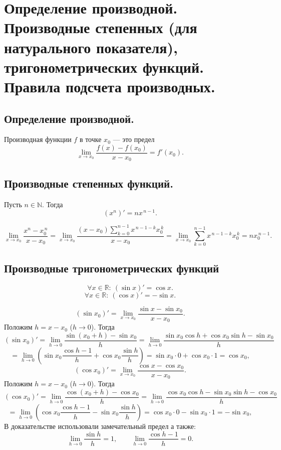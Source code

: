 \section{Определение производной. Производные степенных (для натурального показателя), тригонометрических функций. Правила подсчета производных.}

\subsection{Определение производной.}

\begin{definition}
Производная функции $f$ в точке $x_0$ — это предел
\[
\lim_{x\to x_0}\frac{f(x)-f(x_0)}{x-x_0}
=f'(x_0).
\]
\end{definition}



\subsection{Производные степенных функций.}
\begin{theorem}
Пусть $n\in\mathbb{N}$. Тогда
\[
(x^n)' = n x^{\,n-1}.
\]

\end{theorem}

\begin{Proof}
\[
\lim_{x\to x_0}\frac{x^n-x_0^{\,n}}{x-x_0}
=\lim_{x\to x_0}\frac{(x-x_0)\displaystyle\sum_{k=0}^{n-1}x^{\,n-1-k}x_0^{\,k}}{x-x_0}
=\lim_{x\to x_0}\displaystyle\sum_{k=0}^{n-1}x^{\,n-1-k}x_0^{\,k}
= n x_0^{\,n-1}.
\]
\end{Proof}



\subsection{Производные тригонометрических функций}
\begin{theorem}
\[
\forall x\in\mathbb{R}:\ (\sin x)'=\cos x.
\]
\[
\forall x\in\mathbb{R}:\ (\cos x)'=-\sin x.
\]
\end{theorem}
\begin{Proof}
\[
(\sin x_0)'=\lim_{x\to x_0}\frac{\sin x-\sin x_0}{x-x_0}.
\]
Положим $h=x-x_0$ ($h\to 0$). Тогда
\[
(\sin x_0)'=\lim_{h\to 0}\frac{\sin(x_0+h)-\sin x_0}{h}
=\lim_{h\to 0}\frac{\sin x_0\cos h+\cos x_0\sin h-\sin x_0}{h}
\]
\[
=\lim_{h\to 0}\left(\sin x_0\frac{\cos h-1}{h}+\cos x_0\frac{\sin h}{h}\right)
=\sin x_0\cdot 0+\cos x_0\cdot 1=\cos x_0,
\]
\[
\]
\[
(\cos x_0)'=\lim_{x\to x_0}\frac{\cos x-\cos x_0}{x-x_0}.
\]
Положим $h=x-x_0$ ($h\to 0$). Тогда
\[
(\cos x_0)'=\lim_{h\to 0}\frac{\cos(x_0+h)-\cos x_0}{h}
=\lim_{h\to 0}\frac{\cos x_0\cos h-\sin x_0\sin h-\cos x_0}{h}
\]
\[
=\lim_{h\to 0}\left(\cos x_0\frac{\cos h-1}{h}-\sin x_0\frac{\sin h}{h}\right)
=\cos x_0\cdot 0-\sin x_0\cdot 1=-\sin x_0,
\]
\[
\]
В доказательстве использовали замечательный предел а также:
\[
\lim_{h\to 0}\frac{\sin h}{h}=1,\qquad \lim_{h\to 0}\frac{\cos h-1}{h}=0.
\]
\end{Proof}







